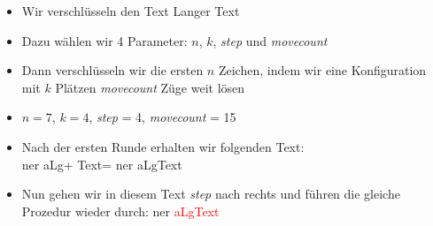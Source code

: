 \begin{frame}
        \begin{itemize}
            \item Wir verschlüsseln den Text \glqq Langer Text\grqq
            \item Dazu wählen wir 4 Parameter: $n$, $k$, \textit{step} und \textit{movecount}
            \item Dann verschlüsseln wir die ersten $n$ Zeichen, indem wir eine Konfiguration mit $k$ Plätzen \textit{movecount} Züge weit lösen
        \end{itemize}
    \begin{myexample}
        \begin{itemize}
            \item $n=7$, $k=4$, \textit{step} = 4, \textit{movecount} = 15
            \item Nach der ersten Runde erhalten wir folgenden Text:\\ \glqq ner aLg\grqq + \glqq Text\grqq = \glqq ner aLgText\grqq
            \item Nun gehen wir in diesem Text \textit{step} nach rechts und führen die gleiche Prozedur wieder durch: \glqq ner \textcolor{red}{aLgText}\grqq
        \end{itemize}   
    \end{myexample}
\end{frame}